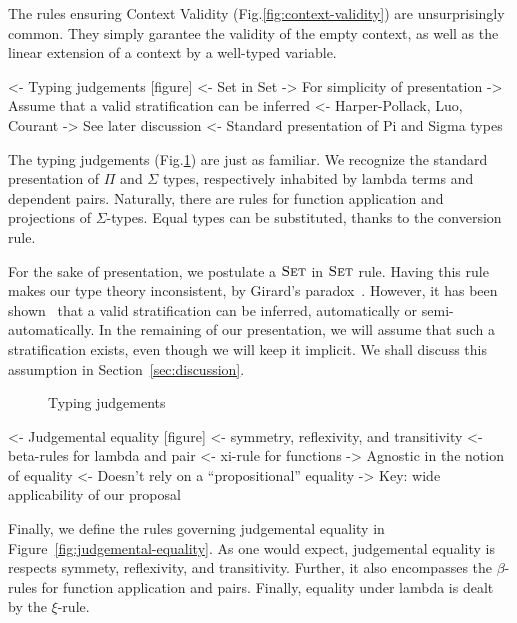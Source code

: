 The rules ensuring Context Validity (Fig.\ref{fig:context-validity})
are unsurprisingly common. They simply garantee the validity of the
empty context, as well as the linear extension of a context by a
well-typed variable.

\begin{wstructure}
<- Typing judgements [figure]
    <- Set in Set
        -> For simplicity of presentation
        -> Assume that a valid stratification can be inferred
            <- Harper-Pollack, Luo, Courant
        -> See later discussion
    <- Standard presentation of Pi and Sigma types
\end{wstructure}

The typing judgements (Fig.\ref{fig:typing-judgements}) are just as
familiar. We recognize the standard presentation of $\Pi$ and $\Sigma$
types, respectively inhabited by lambda terms and dependent
pairs. Naturally, there are rules for function application and
projections of $\Sigma$-types. Equal types can be substituted, thanks
to the conversion rule.

For the sake of presentation, we postulate a $\Set$ in $\Set$
rule. Having this rule makes our type theory inconsistent, by Girard's
paradox~\cite{girard:set-in-set}. However, it has been
shown~\cite{harper:implicit-universe, luo:utt,
  courant:explicit-universe} that a valid stratification can be
inferred, automatically or semi-automatically. In the remaining of our
presentation, we will assume that such a stratification exists, even
though we will keep it implicit. We shall discuss this assumption in
Section~\ref{sec:discussion}.

\begin{figure}



\caption{Typing judgements}
\label{fig:typing-judgements}

\end{figure}


\begin{wstructure}
<- Judgemental equality [figure]
    <- symmetry, reflexivity, and transitivity
    <- beta-rules for lambda and pair
    <- xi-rule for functions
    -> Agnostic in the notion of equality
        <- Doesn't rely on a ``propositional'' equality
        -> Key: wide applicability of our proposal
\end{wstructure}

Finally, we define the rules governing judgemental equality in
Figure~\ref{fig:judgemental-equality}. As one would expect,
judgemental equality is respects symmety, reflexivity, and
transitivity. Further, it also encompasses the $β$-rules for function
application and pairs. Finally, equality under lambda is dealt by the
$ξ$-rule. 

